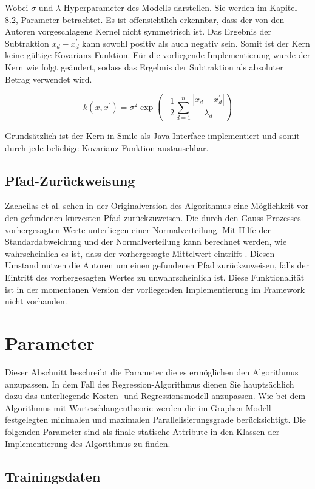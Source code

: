 Wobei \(\sigma\) und \(\lambda\) Hyperparameter des Modells darstellen.
Sie werden im Kapitel 8.2, Parameter betrachtet.
Es ist offensichtlich erkennbar, dass der von den Autoren vorgeschlagene Kernel nicht symmetrisch ist.
Das Ergebnis der Subtraktion \(x_d - x^\prime_d\) kann sowohl positiv als auch negativ sein.
Somit ist der Kern keine gültige Kovarianz-Funktion.
Für die vorliegende Implementierung wurde der Kern wie folgt geändert, sodass das Ergebnis der Subtraktion als absoluter Betrag verwendet wird.


\[k(x, x^\prime) = \sigma^2 \exp{\left( - \frac{1}{2} \sum^{n}_{d=1} \frac{|x_d-x_{d}^{\prime}|}{\lambda_d}\right)}\]

Grundsätzlich ist der Kern in Smile als Java-Interface implementiert und somit durch jede beliebige Kovarianz-Funktion austauschbar.

\subsection{Pfad-Zurückweisung}

Zacheilas et al. sehen in der Originalversion des Algorithmus eine Möglichkeit vor den gefundenen kürzesten Pfad zurückzuweisen.
Die durch den Gauss-Prozesses vorhergesagten Werte unterliegen einer Normalverteilung.
Mit Hilfe der Standardabweichung und der Normalverteilung kann berechnet werden, wie wahrscheinlich es ist, dass der vorhergesagte Mittelwert eintrifft \cite{zacheilas_elastic_2015}.
Diesen Umstand nutzen die Autoren um einen gefundenen Pfad zurückzuweisen, falls der Eintritt des vorhergesagten Wertes zu unwahrscheinlich ist.
Diese Funktionalität ist in der momentanen Version der vorliegenden Implementierung im Framework nicht vorhanden.

\section{Parameter}

Dieser Abschnitt beschreibt die Parameter die es ermöglichen den Algorithmus anzupassen.
In dem Fall des Regression-Algorithmus dienen Sie hauptsächlich dazu das unterliegende Kosten- und Regressionsmodell anzupassen.
Wie bei dem Algorithmus mit Warteschlangentheorie werden die im Graphen-Modell festgelegten minimalen und maximalen Parallelisierungsgrade berücksichtigt.
Die folgenden Parameter sind als finale statische Attribute in den Klassen der Implementierung des Algorithmus zu finden.

\subsection{Trainingsdaten}

